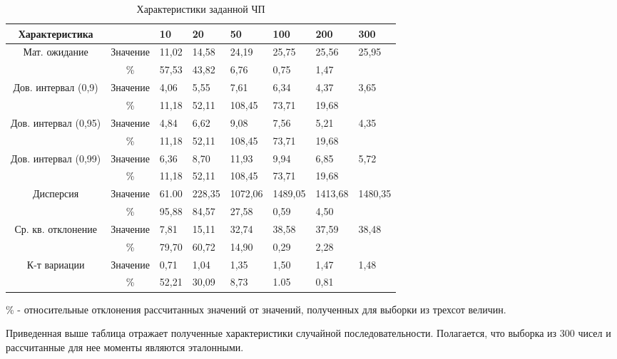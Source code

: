 \documentclass[14pt]{article}
\begin{document}
\begin{table}[h]
	\centering
	\caption{Характеристики заданной ЧП}
	\begin{tabularx}{\textwidth}{| c | c | X | X | X | X | X | X |}
		\hline
		Характеристика & & 10 & 20 & 50 & 100 & 200 & 300 \\
		\hline
		\multirow{2}{*}{Мат. ожидание} & Значение & 11,02  & 14,58  & 24,19  &  25,75 & 25,56 & \multirow{2}{*}{25,95} \\
		\cline{2-7}
		 & \% &  57,53 & 43,82 & 6,76 & 0,75  & 1,47  &   \\
		\hline
		\multirow{2}{*}{Дов. интервал (0,9)} & Значение & 4,06  & 5,55  & 7,61  &  6,34 & 4,37 & \multirow{2}{*}{3,65} \\
		\cline{2-7}
		 & \% & 11,18 & 52,11 & 108,45 & 73,71  & 19,68  & \\
		\hline
		\multirow{2}{*}{Дов. интервал (0,95)} & Значение  & 4,84  & 6,62 & 9,08 & 7,56 & 5,21 &  \multirow{2}{*}{4,35} \\
		\cline{2-7}
		 & \% & 11,18 & 52,11 & 108,45 & 73,71  & 19,68 &  \\
		\hline
		\multirow{2}{*}{Дов. интервал (0,99)} & Значение & 6,36 & 8,70 & 11,93 & 9,94 & 6,85 & \multirow{2}{*}{5,72} \\
		\cline{2-7}
		& \% & 11,18 & 52,11 & 108,45 & 73,71  & 19,68  & \\
		\hline
		\multirow{2}{*}{Дисперсия} & Значение & 61.00 & 228,35 & 1072,06 & 1489,05  & 1413,68 & \multirow{2}{*}{1480,35} \\
		\cline{2-7}
		 & \% &  95,88 & 84,57 & 27,58 & 0,59 & 4,50 & \\
		\hline
		\multirow{2}{*}{Ср. кв. отклонение} & Значение & 7,81 & 15,11 & 32,74  & 38,58 & 37,59 & \multirow{2}{*}{38,48} \\
		\cline{2-7}
		 & \% & 79,70 & 60,72 & 14,90 & 0,29 & 2,28 & \\
		\hline
		\multirow{2}{*}{К-т вариации} & Значение & 0,71 & 1,04 & 1,35 & 1,50 & 1,47 & \multirow{2}{*}{1,48} \\
		\cline{2-7}
		 & \% & 52,21 & 30,09 & 8,73 & 1.05 & 0,81 &  \\
		\hline
	\end{tabularx}
\end{table}
	\% - относительные отклонения рассчитанных значений от значений, полученных для выборки из трехсот величин.

	Приведенная выше таблица отражает полученные характеристики случайной последовательности. Полагается, что выборка из 300 чисел и рассчитанные для нее моменты являются эталонными.
\end{document}
